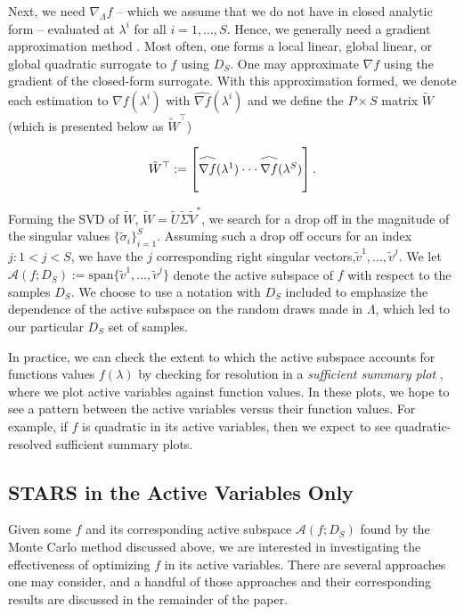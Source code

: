 \documentclass{amsart}
\newcommand{\A}{\mathcal{A}}
\newcommand\reallywidehat[1]{\arraycolsep=0pt\relax%
\begin{array}{c}
\stretchto{
  \scaleto{
    \scalerel*[\widthof{\ensuremath{#1}}]{\kern-.5pt\bigwedge\kern-.5pt}
    {\rule[-\textheight/2]{1ex}{\textheight}} %
  }{\textheight} %
}{0.5ex}\\           %
#1\\                 %
\rule{-1ex}{0ex}
\end{array}
}
\begin{document}
Next, we need $\nabla_\Lambda f$ -- which we assume that we do not have in closed analytic form -- evaluated at $\lambda^i$ for all $i=1,\ldots,S$. Hence, we generally need a gradient approximation method \cite{Constantine2015, Smith}. Most often, one forms a local linear, global linear, or global quadratic surrogate to $f$ using $D_S$. One may approximate $\nabla f$ using the gradient of the closed-form surrogate. With this approximation formed, we denote each estimation to $\nabla f(\lambda^i)$ with $\hat{\nabla f}(\lambda^i)$ and we define the $P \times S$ matrix $\tilde{W}$ (which is presented below as $\tilde{W}^\top$)

\begin{equation} \label{eq:14}
\tilde{W}^\top:=\begin{bmatrix}
\reallywidehat{\nabla f}(\lambda^1)
\cdot \cdot \cdot
\reallywidehat{\nabla f}(\lambda^S)\\
\end{bmatrix}.
\end{equation}  

Forming the SVD of $\tilde{W}$, $\tilde{W}=\tilde{U}\tilde{\Sigma}\tilde{V}^*$, we search for a drop off in the magnitude of the singular values $\{\tilde{\sigma}_i\}_{i=1}^S$. Assuming such a drop off occurs for an index $j:1<j<S$, we have the $j$ corresponding right singular vectors,$ \tilde{v}^1,\ldots,\tilde{v}^{j}$.  We let $\A\left(f; D_S \right):=\text{span}\{\tilde{v}^1,\ldots,\tilde{v}^{j}\}$ denote the active subspace of $f$ with respect to the samples $D_S$. We choose to use a notation with $D_S$ included to emphasize the dependence of the active subspace on the random draws made in $\Lambda$, which led to our particular $D_S$ set of samples.

In practice, we can check the extent to which the active subspace accounts for functions values $f(\lambda)$ 
by checking for resolution in a \emph{sufficient summary plot} \cite{Constantine2015}, where we plot active variables against function values. In these plots, we hope to see a pattern between the active variables versus their function values. For example, if $f$ is quadratic in its active variables, then we expect to see quadratic-resolved sufficient summary plots.



\subsection{STARS in the Active Variables Only} Given some $f$ and its corresponding active subspace $\A(f;D_S)$ found by the Monte Carlo method discussed above, we are interested in investigating the effectiveness of optimizing $f$ in its active variables. There are several approaches one may consider, and a handful of those approaches and their corresponding results are discussed in the remainder of the paper. 
\end{document}
